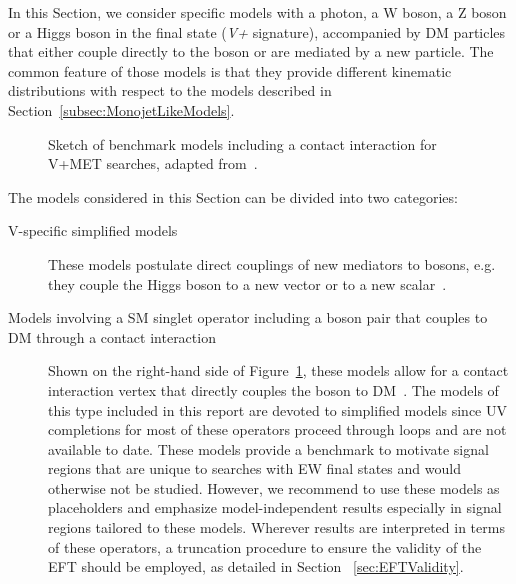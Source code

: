 
In this Section, we consider specific models with a photon, a W boson, a Z boson or a Higgs boson in the final state (\textit{V+\MET} signature), accompanied by DM particles that either couple directly to the boson or are mediated by a new particle. The common feature of those models is that they provide different kinematic distributions with respect to the models described in Section~\ref{subsec:MonojetLikeModels}.



\begin{figure}[h!]
	\centering
	\vspace{\baselineskip}
	\textwidth
	\begin{feynmandiagram}[modelVeft5pt]
	\end{feynmandiagram}
	
	\vspace{\baselineskip}
	\caption{Sketch of benchmark models including a contact interaction
		for V+MET searches, adapted from~\cite{Nelson:2013pqa}. \label{fig:VPlusMET_EFT}}
\end{figure}

The models considered in this Section can be divided into two categories:
\begin{description}
	\item[V-specific simplified models] These models postulate direct couplings of new mediators
	to bosons, e.g. they couple the Higgs boson to a new vector or to a new scalar~\cite{Carpenter:2013xra,Berlin:2014cfa}. 
	\item[Models involving a SM singlet operator including a boson pair that couples to DM through a contact interaction]
	Shown on the right-hand side of Figure~\ref{fig:VPlusMET_EFT},
	these models allow for a contact interaction vertex that directly couples the boson to DM~\cite{Cotta:2012nj, Carpenter:2012rg, Crivellin:2015wva,Berlin:2014cfa}.
	The models of this type included in this report are devoted to simplified models since 
	UV completions for most of these operators proceed through loops and are not available to date. 
	These models provide a benchmark to motivate signal regions that are unique to searches with
	EW final states and would otherwise not be studied. However, we recommend to use these models
	as placeholders and emphasize model-independent results especially in signal regions tailored to these models. 
	Wherever results are interpreted in terms of these operators, a truncation procedure
	to ensure the validity of the EFT should be employed, as detailed in Section ~\ref{sec:EFTValidity}. 
\end{description}


